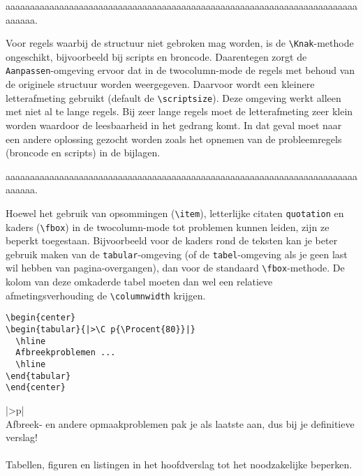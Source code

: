 aaaaaaaaaaaaaaaaaaaaaaaaaaaaaaaaaaaaaaa\Knak{}aaaaaaaaaaaaaaaaaaaaaaaaaaaaaaaaaaaaaaa.

Voor regels waarbij de structuur niet gebroken mag worden, is de
\verb!\Knak!-methode ongeschikt, bijvoorbeeld bij scripts en
broncode. Daarentegen zorgt de \verb!Aanpassen!-omgeving ervoor dat in
de twocolumn-mode de regels met behoud van de originele structuur
worden weergegeven. Daarvoor wordt een kleinere letterafmeting
gebruikt (default de \verb!\scriptsize!). Deze omgeving werkt alleen
met niet al te lange regels. Bij zeer lange regels moet de
letterafmeting zeer klein worden waardoor de leesbaarheid in het
gedrang komt. In dat geval moet naar een andere oplossing gezocht
worden zoals het opnemen van de probleemregels (broncode en scripts)
in de bijlagen.

\begin{Aanpassen}[\tiny]
aaaaaaaaaaaaaaaaaaaaaaaaaaaaaaaaaaaaaaaaaaaaaaaaaaaaaaaaaaaaaaaaaaaaaaaaaaaaaa.
\end{Aanpassen}

Hoewel het gebruik van opsommingen (\verb!\item!), letterlijke citaten
\verb!quotation! en kaders (\verb!\fbox!) in de twocolumn-mode tot
problemen kunnen leiden, zijn ze beperkt toegestaan. Bijvoorbeeld voor
de kaders rond de teksten kan je beter gebruik maken van de
\verb!tabular!-omgeving (of de \verb!tabel!-omgeving als je geen last
wil hebben van pagina-overgangen), dan voor de standaard
\verb!\fbox!-methode. De kolom van deze omkaderde tabel moeten dan wel
een relatieve afmetingsverhouding de \verb!\columnwidth! krijgen.

\begin{Aanpassen}
\begin{verbatim}
\begin{center}
\begin{tabular}{|>\C p{\Procent{80}}|}
  \hline
  Afbreekproblemen ...
  \hline
\end{tabular}
\end{center}
\end{verbatim}
\end{Aanpassen}

\begin{center}
\begin{tabular}{|>\C p{}|}
  \hline
  ~\\
  Afbreek- en andere opmaakproblemen pak je als laatste aan,
  dus bij je definitieve verslag!\\
  ~\\
  Tabellen, figuren en listingen in het hoofdverslag tot het
  noodzakelijke beperken.\\
  ~\\
  \hline
\end{tabular}
\end{center}


